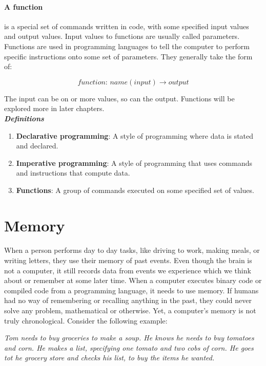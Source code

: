 \paragraph{A function} is a special set of commands written in code, with some specified input values and output values. Input values to functions are usually called parameters. Functions are used in programming languages to tell the computer to perform specific instructions onto some set of parameters. They generally take the form of:

$$
function:\hspace{2pt} name(input) \rightarrow output
$$

The input can be on or more values, so can the output. Functions will be explored more in later chapters. \\

\emph{\textbf{Definitions}}
\begin{enumerate}
\item \textbf{Declarative programming}: A style of programming where data is stated and declared.
\item \textbf{Imperative programming}: A style of programming that uses commands and instructions that compute data.
\item \textbf{Functions}: A group of commands executed on some specified set of values.
\end{enumerate}

\section{Memory}

\paragraph{   } When a person performs day to day tasks, like driving to work, making meals, or writing letters, they use their memory of past events. Even though the brain is not a computer, it still records data from events we experience which we think about or remember at some later time. When a computer executes binary code or compiled code from a programming language, it needs to use memory. If humans had no way of remembering or recalling anything in the past, they could never solve any problem, mathematical or otherwise. Yet, a computer's memory is not truly chronological. Consider the following example:

\begin{center}
\emph{Tom needs to buy groceries to make a soup. He knows he needs to buy tomatoes and corn. He makes a list, specifying one tomato and two cobs of corn. He goes tot he grocery store and checks his list, to buy the items he wanted.}
\end{center}

